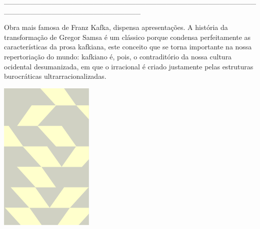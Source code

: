 \hspace*{-2cm}\_\_\_\_\_\_\_\_\_\_\_\_\_\_\_\_\_\_\_\_\_\_\_\_\_\_\_\_\_\_\_\_\_\_\_\_\_\_\_\_\_\_\_\_\_\_\_\_\_\_\_\_\_\_\_\_\_\_\_\_\_\_\_\_\_\_\_\_\_\_\_\_\_\_

\medskip

\noindent{}Obra mais famosa de Franz Kafka, {} dispensa apresentações. A história da transformação de Gregor Samsa é um clássico porque condensa perfeitamente as características da prosa kafkiana, este conceito que se torna importante na nossa repertoriação do mundo: kafkiano é, pois, o contraditório da nossa cultura ocidental desumanizada, em que o irracional é criado justamente pelas estruturas burocráticas ultrarracionalizadas.

\hspace{.5cm}

\hspace*{-.4cm}\begin{minipage}[c]{0.90\linewidth}
\small{
{}}
\end{minipage}


\pagebreak

\hspace{.5cm}

\begin{center}
\hspace*{-2.5cm}
\hspace{2cm}\includegraphics[width=45mm]{./imgs/maquiavel.png}
\end{center}

